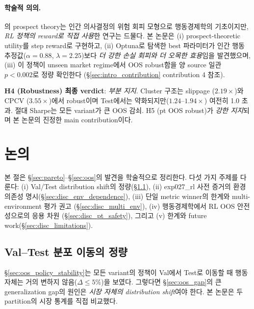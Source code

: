 \documentclass[11pt, a4paper]{article}
\begin{document}
\paragraph{학술적 의의.}
\citet{kahneman1979prospect}의 prospect theory는 인간 의사결정의 위험 회피
모형으로 행동경제학의 기초이지만, \emph{RL 정책의 reward로 직접 사용}한 연구는
드물다. 본 논문은 (i) prospect-theoretic utility를 step reward로 구현하고,
(ii) Optuna로 탐색한 best 파라미터가 인간 행동 추정값($\alpha=0.88$,
$\lambda=2.25$)보다 \emph{더 강한 손실 회피와 더 오목한 효용}임을 발견했으며,
(iii) 이 정책이 unseen market regime에서 OOS robust함을 양 source 일관
$p < 0.002$로 정량 확인한다 (\S\ref{sec:intro_contribution} contribution 4
참조).

\textbf{H4 (Robustness) 최종 verdict}: \emph{부분 지지}. Cluster 구조는
slippage ($2.19\times$)와 CPCV ($3.55\times$)에서 robust이며 Test에서는
약화되지만($1.24$--$1.94\times$) 여전히 1.0 초과. 절대 Sharpe는 모든 variant가
큰 OOS 감쇠. H5 (pt OOS robust)가 \emph{강한 지지}되며 본 논문의 진정한 main
contribution이다.

\section{논의}
\label{sec:discussion}

본 절은 \S\ref{sec:pareto}--\S\ref{sec:oos}의 발견을 학술적으로 정리한다.
다섯 가지 주제를 다룬다: (i) Val/Test distribution shift의 정량(\S\ref{sec:disc_shift}),
(ii) exp027\_rl 사전 증거의 환경 의존성 명시(\S\ref{sec:disc_env_dependence}),
(iii) 단일 metric winner의 한계와 multi-environment 평가 권고
(\S\ref{sec:disc_multi_env}), (iv) 행동경제학에서 RL OOS 안전성으로의 응용 차원
(\S\ref{sec:disc_pt_safety}), 그리고 (v) 한계와 future work(\S\ref{sec:disc_limitations}).

\subsection{Val--Test 분포 이동의 정량}
\label{sec:disc_shift}

\S\ref{sec:oos_policy_stability}는 모든 variant의 정책이 Val에서 Test로 이동할
때 행동 자체는 거의 변하지 않음($\Delta \leq 5\%$)을 보였다. 그렇다면 \S\ref{sec:oos_gap}의
큰 generalization gap의 원인은 \emph{시장 자체의 distribution shift}여야 한다.
본 논문은 두 partition의 시장 통계를 직접 비교했다.
\end{document}
